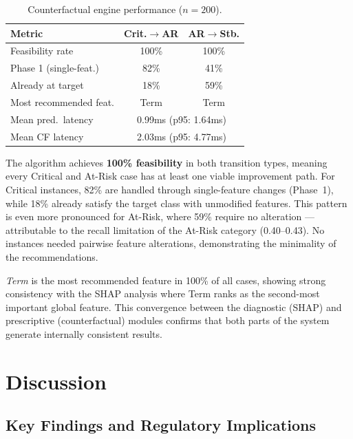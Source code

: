 \documentclass[conference]{IEEEtran}
\begin{document}
\begin{table}[htbp]
\centering
\caption{Counterfactual engine performance ($n = 200$).}
\label{tab:cf_eval}
\begin{tabular}{lcc}
\hline
\textbf{Metric} & \textbf{Crit.$\rightarrow$AR} & \textbf{AR$\rightarrow$Stb.} \\
\hline
Feasibility rate       & 100\% & 100\% \\
Phase 1 (single-feat.) & 82\%  & 41\%  \\
Already at target      & 18\%  & 59\%  \\
Most recommended feat. & Term  & Term  \\
Mean pred.\ latency    & \multicolumn{2}{c}{0.99ms (p95: 1.64ms)} \\
Mean CF latency        & \multicolumn{2}{c}{2.03ms (p95: 4.77ms)} \\
\hline
\end{tabular}
\end{table}

The algorithm achieves \textbf{100\% feasibility} in both transition types, meaning every Critical and At-Risk case has at least one viable improvement path. For Critical instances, 82\% are handled through single-feature changes (Phase~1), while 18\% already satisfy the target class with unmodified features. This pattern is even more pronounced for At-Risk, where 59\% require no alteration --- attributable to the recall limitation of the At-Risk category (0.40--0.43). No instances needed pairwise feature alterations, demonstrating the minimality of the recommendations.

\textit{Term} is the most recommended feature in 100\% of all cases, showing strong consistency with the SHAP analysis where Term ranks as the second-most important global feature. This convergence between the diagnostic (SHAP) and prescriptive (counterfactual) modules confirms that both parts of the system generate internally consistent results.


\section{Discussion}

\subsection{Key Findings and Regulatory Implications}
\end{document}
